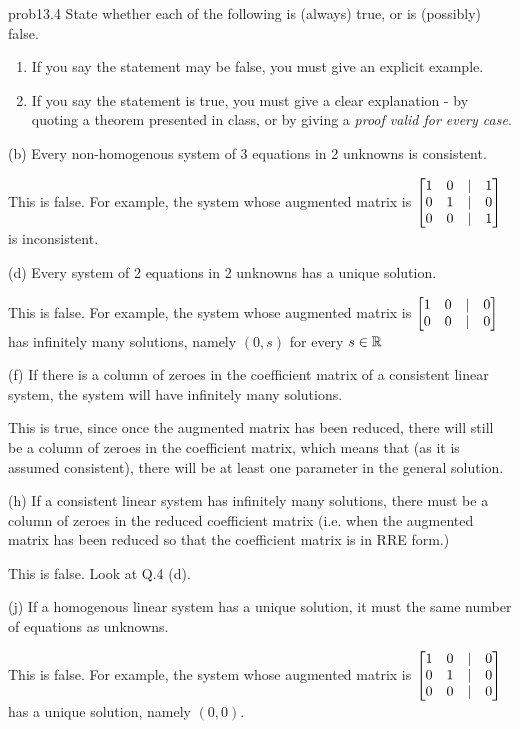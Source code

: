 \begin{sol}{prob13.4}   State whether each of the following is (always) true,
or is (possibly) false.    
   \medskip    
\begin{enumerate}[$\bullet$]
\item If you say the statement may be false, you   must give an explicit example.  
\item If you say the statement is true, you must give a clear explanation -   by quoting a theorem presented in class, or by giving a {\it proof valid for every  case}. 
\end{enumerate}
\medskip

(b)  Every non-homogenous system of 3 equations in 2 unknowns is consistent.


\soln This is false. For example, the system whose augmented matrix is 
$\bmatrix  
1 & 0 &|& 1 \\
0 & 1 &|& 0\\
0 & 0 &|& 1 \endbmatrix$ is inconsistent.
\medskip
%

(d) Every  system of 2 equations in 2 unknowns has a unique solution.

\soln This is false. For example, the system whose augmented matrix is 
$\bmatrix  
1 & 0 &|& 0 \\
0 & 0 &|& 0\\
 \endbmatrix$ has infinitely many solutions, namely $ (0,s) $ for every $s\in \mathbb{R}$
\medskip

(f) If there is a column of zeroes in the coefficient matrix of a consistent linear system, the system will have infinitely many solutions.

\soln This is true, since once the augmented matrix has been reduced, there will still be a column of zeroes in the coefficient matrix, which means that (as it is assumed consistent), there will be at least one parameter in the general solution.
\medskip

(h) If a consistent linear system has infinitely many solutions, there must be a column of zeroes in the reduced coefficient matrix (i.e. when the augmented matrix has been reduced so that the coefficient matrix is in RRE form.)

\soln This is false. Look at Q.4 (d).
\medskip
%

(j) If a homogenous linear system has a unique solution, it must the same number of equations as unknowns. 

\soln This is false. For example, the system whose augmented matrix is 
$\bmatrix  
1 & 0 &|& 0 \\
0 & 1 &|& 0\\
0 & 0 &|& 0 \endbmatrix$ has a unique solution, namely $(0,0)$.
\medskip
%

\end{sol}

